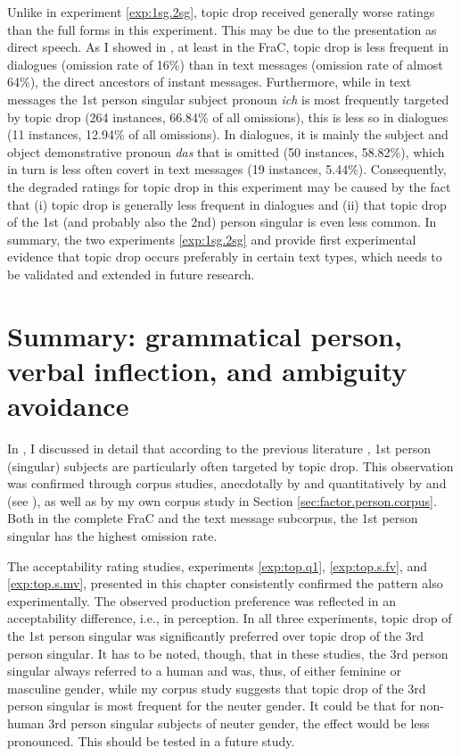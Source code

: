 Unlike in experiment \ref*{exp:1sg.2sg}, topic drop received generally worse ratings than the full forms in this experiment.
This may be due to the presentation as direct speech.
As I showed in , at least in the FraC, topic drop is less frequent in dialogues (omission rate of 16\%) than in text messages (omission rate of almost 64\%), the direct ancestors of instant messages.
Furthermore, while in text messages the 1st person singular subject pronoun \textit{ich} is most frequently targeted by topic drop (264 instances, 66.84\% of all omissions), this is less so in dialogues (11 instances, 12.94\% of all omissions).
In dialogues, it is mainly the subject and object demonstrative pronoun \textit{das} that is omitted (50 instances, 58.82\%), which in turn is less often covert in text messages (19 instances, 5.44\%).
Consequently, the degraded ratings for topic drop in this experiment may be caused by the fact that (i) topic drop is generally less frequent in dialogues and (ii) that topic drop of the 1st (and probably also the 2nd) person singular is even less common.
In summary, the two experiments \ref*{exp:1sg.2sg} and  provide first experimental evidence that topic drop occurs preferably in certain text types,  which needs to be validated and extended in future research. 

\section{Summary: grammatical person, verbal inflection, and ambiguity avoidance}
In , I discussed in detail that according to the previous literature \citep[e.g.,][]{tesak.dittmann1991, volodina.onea2012, imo2013, imo2014}, 1st person (singular) subjects are particularly often targeted by topic drop.
This observation was confirmed through corpus studies, anecdotally by \citet{auer1993, doring2002} and quantitatively by \citet{androutsopoulos.schmidt2002} and \citet{frick2017} (see ), as well as by my own corpus study in Section  \ref{sec:factor.person.corpus}.
Both in the complete FraC and the text message subcorpus, the 1st person singular has the highest omission rate.

The acceptability rating studies, experiments \ref*{exp:top.q1}, \ref*{exp:top.s.fv}, and \ref*{exp:top.s.mv}, presented in this chapter consistently confirmed the pattern also experimentally.
The observed production preference was reflected in an acceptability difference, i.e., in perception.
In all three experiments, topic drop of the 1st person singular was significantly preferred over topic drop of the 3rd person singular.
It has to be noted, though, that in these studies, the 3rd person singular always referred to a human and was, thus, of either feminine or masculine gender, while my corpus study suggests that topic drop of the 3rd person singular is most frequent for the neuter gender.
It could be that for non-human 3rd person singular subjects of neuter gender, the effect would be less pronounced.
This should be tested in a future study.

